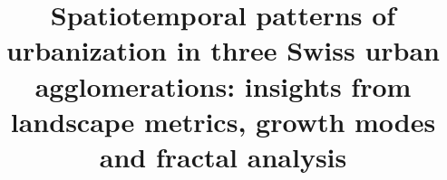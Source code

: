 %
%
%
%
%
%
\RequirePackage{fix-cm}
%
\documentclass[smallextended, natbib]{svjour3}       %
%
\smartqed  %
%
\usepackage{graphicx}

%
%
\usepackage[misc]{ifsym} %
\usepackage{nameref,hyperref}
\usepackage{booktabs}
\usepackage{changepage}
\usepackage{subcaption}

\newcommand{\mycitet}[1]{\citetalias{#1} (\citeyear{#1})}
\newcommand{\mycitep}[1]{(\citetalias{#1} \citeyear{#1})}

%




\title{Spatiotemporal patterns of urbanization in three Swiss urban agglomerations: insights from landscape metrics, growth modes and fractal analysis%
}


